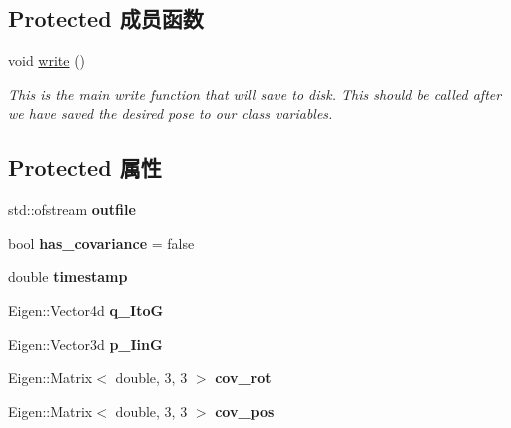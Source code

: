 \subsection*{Protected 成员函数}
\begin{DoxyCompactItemize}
\item 
\mbox{\label{classov__eval_1_1Recorder_a57b309de81ce7312ff3f07125d03ee7a}} 
void \hyperlink{classov__eval_1_1Recorder_a57b309de81ce7312ff3f07125d03ee7a}{write} ()
\begin{DoxyCompactList}\small\item\em This is the main write function that will save to disk. This should be called after we have saved the desired pose to our class variables. \end{DoxyCompactList}\end{DoxyCompactItemize}
\subsection*{Protected 属性}
\begin{DoxyCompactItemize}
\item 
\mbox{\label{classov__eval_1_1Recorder_ab175907faecd57d895b4e3ac25dba7d5}} 
std\+::ofstream {\bfseries outfile}
\item 
\mbox{\label{classov__eval_1_1Recorder_a3a11f4b799275ea1d0d8790af3085014}} 
bool {\bfseries has\+\_\+covariance} = false
\item 
\mbox{\label{classov__eval_1_1Recorder_a7f094609e17a0251a68a96f19bd8ba18}} 
double {\bfseries timestamp}
\item 
\mbox{\label{classov__eval_1_1Recorder_a3e9cd436f944aeff84ca044644cd9333}} 
Eigen\+::\+Vector4d {\bfseries q\+\_\+\+ItoG}
\item 
\mbox{\label{classov__eval_1_1Recorder_a3fc04158a626ca3d84f4beac6a7c0918}} 
Eigen\+::\+Vector3d {\bfseries p\+\_\+\+IinG}
\item 
\mbox{\label{classov__eval_1_1Recorder_a521ab33ed3681e03f6d03e391c4795a2}} 
Eigen\+::\+Matrix$<$ double, 3, 3 $>$ {\bfseries cov\+\_\+rot}
\item 
\mbox{\label{classov__eval_1_1Recorder_a0a20dbfd92839ebf9455cc4145b96cdb}} 
Eigen\+::\+Matrix$<$ double, 3, 3 $>$ {\bfseries cov\+\_\+pos}
\end{DoxyCompactItemize}


